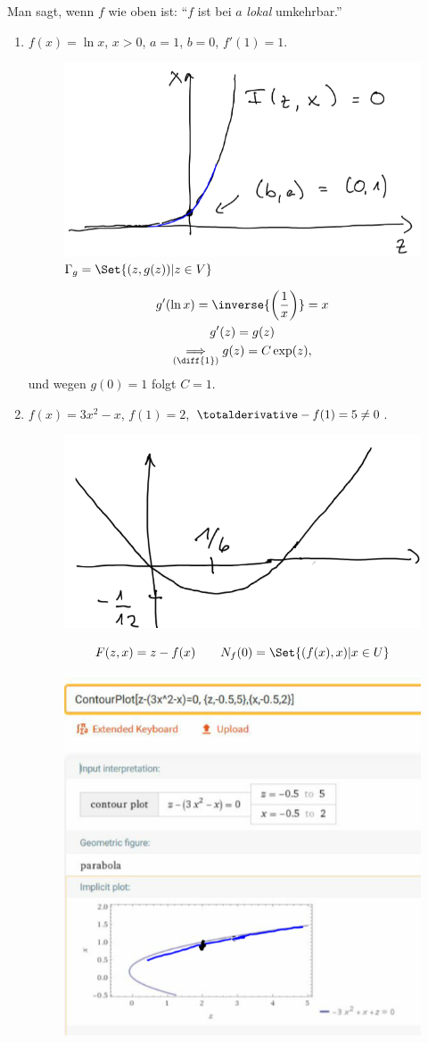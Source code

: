 Man sagt, wenn \( f \) wie oben ist: \enquote{\( f \) ist bei \( a \) \emph{lokal} umkehrbar.}
\begin{beispiele}
  \begin{enumerate}
    \item \( f(x)=\ln x \), \( x>0 \), \( a=1 \), \( b=0 \), \( f'(1)=1 \).
    \begin{figure}[H]
      \centering
      \includegraphics[width=0.5\linewidth]{figures/satz_von_der_umkehrungsfunktion_beispiel_ln}
      \caption*{\textcolor{Blue}{\( \Gamma_g=\Set{(z,g(z))|z\in V} \)}}
      \label{fig:satz_von_der_umkehrungsfunktion_beispiel_ln}
    \end{figure}
    \begin{gather*}
      g'(\ln x)=\inverse{\left( \frac{1}{x} \right)}=x\\
      g'(z)=g(z)\\
      \underset{(\text{\diff{1}})}{\implies} g(z)=C\exp (z),
    \end{gather*}
    und wegen \( g(0)=1 \) folgt \( C=1 \).
    \item \( f(x)=3x^2-x \), \( f(1)=2 \), \( \totalderivative-{f}(1)=5\neq 0 \).
    \begin{figure}[H]
      \centering
      \includegraphics[width=0.5\linewidth]{figures/satz_von_der_umkehrungsfunktion_beispiel_parabel}
      \label{fig:satz_von_der_umkehrungsfunktion_beispiel_parabel}
    \end{figure}
    \begin{equation*}
      F(z,x)=z-f(x)\qquad N_f(0)=\Set{(f(x),x)|x\in U}
    \end{equation*}
    \begin{figure}[H]
      \centering
      \includegraphics[width=0.5\linewidth]{figures/satz_von_der_umkehrungsfunktion_beispiel_parabel_umkehrung}

\end{figure}
\end{enumerate}
\end{beispiele}
